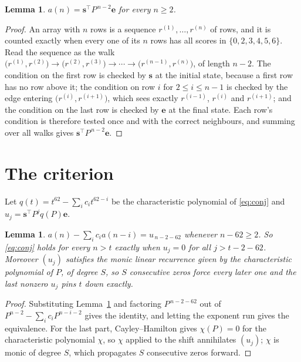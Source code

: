 \documentclass[11pt,a4paper]{article}
\theoremstyle{plain}
\newtheorem{lemma}[theorem]{Lemma}
\theoremstyle{definition}
\begin{document}
\begin{lemma}\label{lem:walk}
$a(n)=\mathbf{s}^{\!\top}P^{\,n-2}\mathbf{e}$ for every $n\ge2$.
\end{lemma}

\begin{proof}
An array with $n$ rows is a sequence $r^{(1)},\dots,r^{(n)}$ of rows, and it is counted
exactly when every one of its $n$ rows has all scores in $\{0,2,3,4,5,6\}$. Read the sequence as the
walk $\bigl(r^{(1)},r^{(2)}\bigr)\to\bigl(r^{(2)},r^{(3)}\bigr)\to\cdots\to
\bigl(r^{(n-1)},r^{(n)}\bigr)$, of length $n-2$. The condition on the first row is
checked by $\mathbf{s}$ at the initial state, because a first row has no row above it; the
condition on row $i$ for $2\le i\le n-1$ is checked by the edge entering
$\bigl(r^{(i)},r^{(i+1)}\bigr)$, which sees exactly $r^{(i-1)}$, $r^{(i)}$ and
$r^{(i+1)}$; and the condition on the last row is checked by $\mathbf{e}$ at the final
state. Each row's condition is therefore tested once and with the correct neighbours, and
summing over all walks gives $\mathbf{s}^{\!\top}P^{\,n-2}\mathbf{e}$.
\end{proof}

\section{The criterion}

Let $q(t)=t^{62}-\sum_i c_i t^{62-i}$ be the characteristic polynomial of
\eqref{eq:conj} and $u_j=\mathbf{s}^{\!\top}P^{j}q(P)\mathbf{e}$.

\begin{lemma}\label{lem:crit}
$a(n)-\sum_i c_i a(n-i)=u_{\,n-2-62}$ whenever $n-62\ge2$. So \eqref{eq:conj}
holds for every $n>t$ exactly when $u_j=0$ for all $j>t-2-62$. Moreover $(u_j)$
satisfies the monic linear recurrence given by the characteristic polynomial of $P$, of
degree $S$, so $S$ consecutive zeros force every later one and the last nonzero $u_j$ pins
$t$ down exactly.
\end{lemma}

\begin{proof}
Substituting Lemma~\ref{lem:walk} and factoring $P^{\,n-2-62}$ out of
$P^{n-2}-\sum_i c_i P^{n-i-2}$ gives the identity, and letting the exponent run gives the
equivalence. For the last part, Cayley--Hamilton gives $\chi(P)=0$ for the characteristic
polynomial $\chi$, so $\chi$ applied to the shift annihilates $(u_j)$; $\chi$ is monic of
degree $S$, which propagates $S$ consecutive zeros forward.
\end{proof}
\end{document}

